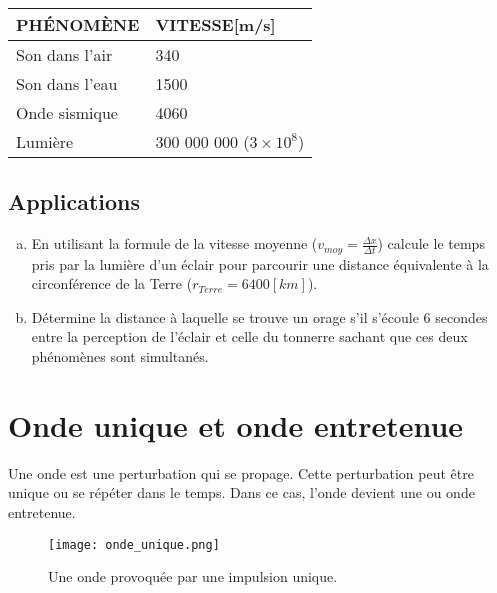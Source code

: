 \begin{center}
    \begin{tabularx}{.8 \textwidth}{m{} X}
        \hline
        \uppercase{Phénomène} & \uppercase{Vitesse}[m/s]        \\
        \hline
        Son dans l'air        & 340                             \\
        \hline
        Son dans l'eau        & 1500                            \\
        \hline
        Onde sismique         & 4060                            \\
        \hline
        Lumière               & 300 000 000 (\(3 \times 10^8\)) \\
        \hline
    \end{tabularx}
\end{center}


\subsection{Applications}
\begin{enumerate}[a)]
    \item En utilisant la formule de la vitesse moyenne (\(v_{moy}=\frac{\Delta x}{\Delta t}\)) calcule le temps pris par la lumière d'un éclair pour parcourir une distance équivalente à la circonférence de la Terre (\(r_{Terre} = 6400 [ km]\)).
    \item Détermine la distance à laquelle se trouve un orage s'il s'écoule 6 secondes entre la perception de l'éclair et celle du tonnerre sachant que ces deux phénomènes sont simultanés.
\end{enumerate}

\newpage

\section{Onde unique et onde entretenue}
\label{Onde unique et onde entretenue}
Une onde est une perturbation qui se propage. Cette perturbation peut être unique ou se répéter dans le temps. Dans ce cas, l'onde devient une  ou onde entretenue.

\begin{figure}[h!]
    \centering
    \texttt{[image: onde\_unique.png]}
    \caption{Une onde provoquée par une impulsion unique.}
    \label{onde_unique}
\end{figure}

